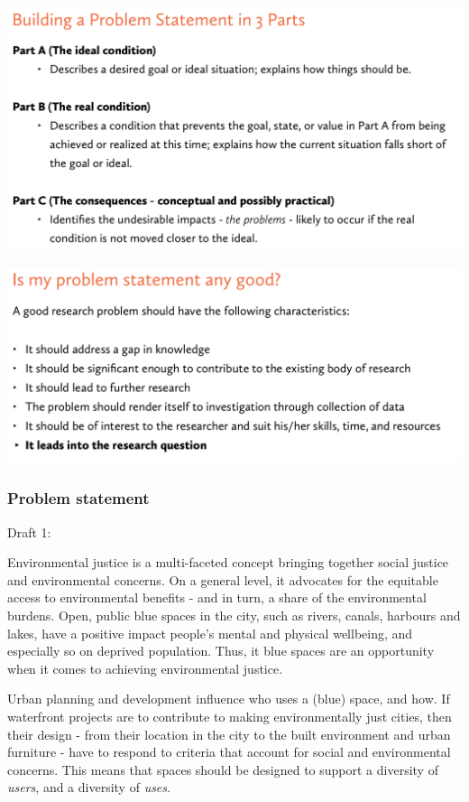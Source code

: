 \documentclass{article}
\begin{document}
\includegraphics[width=\textwidth]{problem_statement1}

\includegraphics[width=\textwidth]{problem_statement2}

\pagebreak

\subsubsection{Problem statement}

Draft 1:

Environmental justice is a multi-faceted concept bringing together social justice and environmental concerns. On a general level, it advocates for the equitable access to environmental benefits - and in turn, a share of the environmental burdens.
Open, public blue spaces in the city, such as rivers, canals, harbours and lakes, have a positive impact people's mental and physical wellbeing, and especially so on deprived population. Thus, it blue spaces are an opportunity when it comes to achieving environmental justice.

Urban planning and development influence who uses a (blue) space, and how.
If waterfront projects are to contribute to making environmentally just cities, then their design - from their location in the city to the built environment and urban furniture - have to respond to criteria that account for social and environmental concerns. 
This means that spaces should be designed to support a diversity of \textit{users}, and a diversity of \textit{uses}.
\end{document}
